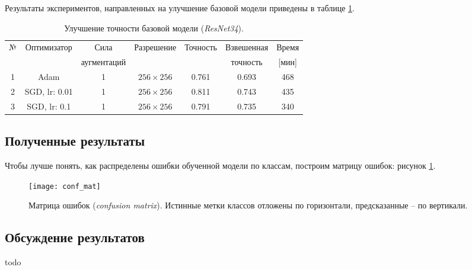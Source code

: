 Результаты экспериментов, направленных на улучшение базовой модели
приведены в таблице \ref{tabular: train_tricks}.


\begin{table}[h]
    \begin{center}
        \begin{tabular}{c | c| c | c | c| c| c}
            \hline
            № & Оптимизатор & Сила & Разрешение & Точность & Взвешенная  & Время \\
            & & аугментаций & & & точность & [мин] \\
            \hline
    
           1 & Adam & 1 & $256 \times 256$ & 0.761 & 0.693 & 468 \\
           
           2 & SGD, lr: 0.01 & 1 & $256 \times 256 $ & 0.811 & 0.743 & 435 \\
           
           3 & SGD, lr: 0.1 & 1 & $256 \times 256 $ & 0.791 & 0.735 & 340 \\
               
            \hline
        \end{tabular}
    \end{center}
    \caption{Улучшение точности базовой модели (\textit{ResNet34}).}
    \label{tabular: train_tricks}
\end{table}



\subsection{Полученные результаты}

\indent
\indent
Чтобы лучше понять, как распределены ошибки обученной модели по классам,
построим матрицу ошибок: рисунок \ref{tikzpicture: conf_mat}.

\begin{figure}[h!]
    \begin{center}
   	    \texttt{[image: conf\_mat]}
   	\end{center}
   	\caption{Матрица ошибок (\textit{confusion matrix}). Истинные метки 
   	               классов отложены по горизонтали, предсказанные -- по вертикали.}
   	\label{tikzpicture: conf_mat}
\end{figure}


\indent
\indent




\subsection{Обсуждение результатов}
todo
